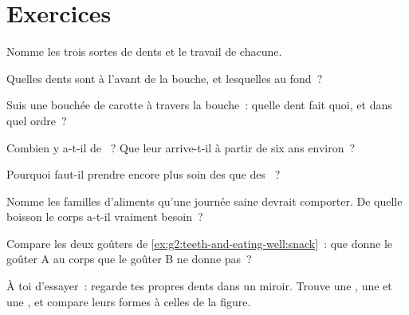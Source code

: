\section{Exercices}

\begin{exercise}[$\star$]\label{exo:g2:teeth-and-eating-well:1}
Nomme les trois sortes de dents et le travail de chacune.
\end{exercise}

\begin{exercise}[$\star$]\label{exo:g2:teeth-and-eating-well:2}
Quelles dents sont à l'avant de la bouche, et lesquelles au fond~?
\end{exercise}

\begin{exercise}[$\star$]\label{exo:g2:teeth-and-eating-well:3}
Suis une bouchée de carotte à travers la bouche~: quelle dent fait
quoi, et dans quel ordre~?
\end{exercise}

\begin{exercise}[$\star$]\label{exo:g2:teeth-and-eating-well:4}
Combien y a-t-il de ~? Que leur arrive-t-il à partir de
six ans environ~?
\end{exercise}

\begin{exercise}[$\star$]\label{exo:g2:teeth-and-eating-well:5}
Pourquoi faut-il prendre encore plus soin des  que des
~?
\end{exercise}

\begin{exercise}[$\star$]\label{exo:g2:teeth-and-eating-well:6}
Nomme les familles d'aliments qu'une journée saine devrait
comporter. De quelle boisson le corps a-t-il vraiment besoin~?
\end{exercise}

\begin{exercise}[$\star$]\label{exo:g2:teeth-and-eating-well:7}
Compare les deux goûters de
\cref{ex:g2:teeth-and-eating-well:snack}~: que donne le goûter A au
corps que le goûter B ne donne pas~?
\end{exercise}

\begin{exercise}[$\star$]\label{exo:g2:teeth-and-eating-well:8}
À toi d'essayer~: regarde tes propres dents dans un miroir. Trouve
une , une  et une , et compare leurs formes à
celles de la figure.
\end{exercise}

